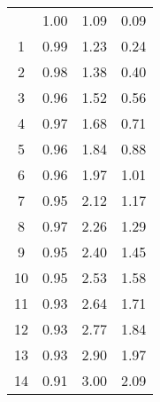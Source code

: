 \begin{longtable}[c]{cccc}
	\endlastfoot
	0                         & 1.00                           & 1.09                                      & 0.09                         \\
	1                         & 0.99                           & 1.23                                      & 0.24                         \\
	2                         & 0.98                           & 1.38                                      & 0.40                         \\
	3                         & 0.96                           & 1.52                                      & 0.56                         \\
	4                         & 0.97                           & 1.68                                      & 0.71                         \\
	5                         & 0.96                           & 1.84                                      & 0.88                         \\
	6                         & 0.96                           & 1.97                                      & 1.01                         \\
	7                         & 0.95                           & 2.12                                      & 1.17                         \\
	8                         & 0.97                           & 2.26                                      & 1.29                         \\
	9                         & 0.95                           & 2.40                                      & 1.45                         \\
	10                        & 0.95                           & 2.53                                      & 1.58                         \\
	11                        & 0.93                           & 2.64                                      & 1.71                         \\
	12                        & 0.93                           & 2.77                                      & 1.84                         \\
	13                        & 0.93                           & 2.90                                      & 1.97                         \\
	14                        & 0.91                           & 3.00                                      & 2.09                         \\

\end{longtable}
